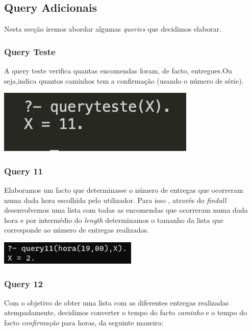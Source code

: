 \documentclass[a4paper,12pt]{article}
\begin{document}
    \subsection{Query Adicionais}
        Nesta secção iremos abordar algumas \emph{queries} que decidimos elaborar.\par
    
        \subsubsection{Query Teste}
        A query teste verifica quantas encomendas foram, de facto, entregues.Ou seja,indica quantos caminhos tem a confirmação (usando o número de série). 
        \begin{center}
                \includegraphics[scale=0.8]{imagens/queryteste.png}
            \end{center}
    
        \subsubsection{Query 11} 
            Elaboramos um facto que determinasse o número de entregas que ocorreram numa dada hora escolhida pelo utilizador. Para isso , através do \emph{findall} desenvolvemos uma lista com todas as encomendas que ocorreram numa dada hora e por intermédio do \emph{length} determinamos o tamanho da lista que corresponde ao número de entregas realizadas.\par
        
            \begin{center}
                \includegraphics[scale=1]{imagens/query11.png}
            \end{center}
    
    
        \subsubsection{Query 12}
            Com o objetivo de obter uma lista com as diferentes entregas realizadas atempadamente, decidimos converter o tempo do facto \emph{caminho} e o tempo do facto \emph{confirmação} para horas, da seguinte maneira:\par
        
\end{document}
